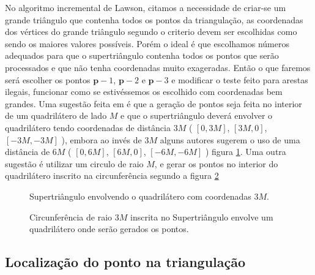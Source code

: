 \documentclass[12pt,a4paper]{book}
\begin{document}
No algoritmo incremental de Lawson, citamos a necessidade de criar-se um grande tri\^angulo que contenha todos os pontos da triangula\c{c}\~{a}o, as coordenadas dos v\'{e}rtices do grande tri\^{a}ngulo segundo o criterio devem ser escolhidas como sendo os maiores valores poss\'{i}veis. Por\'em o ideal \'{e} que escolhamos n\'umeros adequados para que o supertri\^{a}ngulo contenha todos os pontos que ser\~{a}o processados e que n\~{a}o tenha coordenadas muito exageradas. Ent\~{a}o o que faremos ser\'{a} escolher os pontos ${\mathbf p}-1$, ${\mathbf p}
-2$ e ${\mathbf p}-3$ e modificar o teste feito para arestas ilegais, funcionar como se estiv\'essemos os escolhido com coordenadas bem grandes. Uma sugest\~{a}o feita em \cite{berg} \'{e} que a gera\c{c}\~{a}o de pontos seja feita no interior de um quadril\'{a}tero de lado $M$ e que o supertri\^{a}ngulo dever\'{a} envolver o quadril\'{a}tero tendo coordenadas de dist\^ancia $3M$ ( $[0, 3M]$, $[3M, 0]$, $[-3M, -3M]$ ), embora ao inv\'{e}s de $3M$ alguns autores sugerem o uso de uma dist\^ancia de $6M$ ( $[0, 6M]$, $[6M, 0]$, $[-6M, -6M]$ ) figura \ref{super_tri_3M}.
Uma outra sugest\~{a}o \'{e} utilizar um circulo de raio $M$, e gerar os pontos no interior do quadril\'{a}tero inscrito na circunfer\^{e}ncia segundo a figura \ref{super_tri_circ_3M}

\begin{figure}[htbp]
  \begin{center}
    \leavevmode
    
    \caption{Supertri\^angulo envolvendo o quadril\'atero com coordenadas $3M$.}
    \label{super_tri_3M}
  \end{center}
\end{figure}


\begin{figure}[htbp]
  \begin{center}
    \leavevmode
   
    \caption{Circunfer\^encia de raio  $3M$ inscrita no Supertri\^angulo envolve um quadril\'atero onde ser\~ao gerados os pontos.}
    \label{super_tri_circ_3M}
  \end{center}
\end{figure}

\subsection{Localiza\c{c}\~{a}o do ponto na triangula\c{c}\~{a}o} \label{section_localization}
\end{document}

